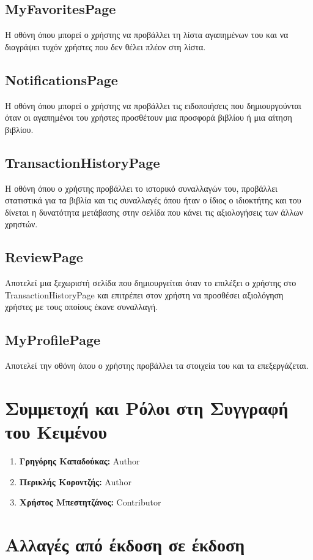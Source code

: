 \documentclass[12pt,a4paper]{article}
\begin{document}
\subsection{MyFavoritesPage}
Η οθόνη όπου μπορεί ο χρήστης να προβάλλει τη λίστα αγαπημένων του και να διαγράψει τυχόν χρήστες που δεν θέλει πλέον στη λίστα.

\subsection{NotificationsPage}
Η οθόνη όπου μπορεί ο χρήστης να προβάλλει τις ειδοποιήσεις που δημιουργούνται όταν οι αγαπημένοι του χρήστες προσθέτουν μια προσφορά βιβλίου ή μια αίτηση βιβλίου.

\subsection{TransactionHistoryPage}
H οθόνη όπου ο χρήστης προβάλλει το ιστορικό συναλλαγών του, προβάλλει στατιστικά για τα βιβλία και τις συναλλαγές όπου ήταν ο ίδιος ο ιδιοκτήτης και του δίνεται η δυνατότητα μετάβασης στην σελίδα που κάνει τις αξιολογήσεις των άλλων χρηστών.

\subsection{ReviewPage}
Αποτελεί μια ξεχωριστή σελίδα που δημιουργείται όταν το επιλέξει ο χρήστης στο TransactionHistoryPage και επιτρέπει στον χρήστη να προσθέσει αξιολόγηση χρήστες με τους οποίους έκανε συναλλαγή.

\subsection{MyProfilePage}
Αποτελεί την οθόνη όπου ο χρήστης προβάλλει τα στοιχεία του και τα επεξεργάζεται.

\section{Συμμετοχή και Ρόλοι στη Συγγραφή του Κειμένου}
\begin{enumerate}
	\item \textbf{Γρηγόρης Καπαδούκας:} Author
	\item \textbf{Περικλής Κοροντζής:} Author
    \item \textbf{Χρήστος Μπεστητζάνος:} Contributor
\end{enumerate}

\section{Αλλαγές από έκδοση σε έκδοση}
\end{document}

